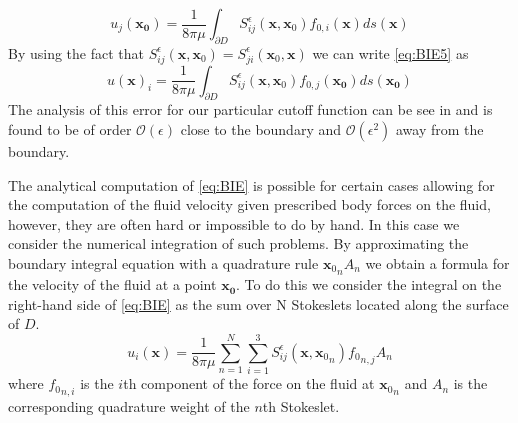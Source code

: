 \begin{equation}
    u_j(\mathbf{x_0}) = \frac{1}{8 \pi \mu} \int_{\partial D} S_{i j}^{\epsilon}\left(\mathbf{x}, \mathbf{x}_{0}\right) f_{0,i}(\mathbf{x}) d s(\mathbf{x})
\end{equation}
By using the fact that $S_{i j}^{\epsilon}\left(\mathbf{x}, \mathbf{x}_{0}\right) = S_{j i}^{\epsilon}\left(\mathbf{x}_{0}, \mathbf{x}\right)$ we can write \cref{eq:BIE5} as 
\begin{equation}
  \label{eq:BIE}
    u(\mathbf{x})_i=\frac{1}{8 \pi \mu} \int_{\partial D} S_{i j}^{\epsilon}\left(\mathbf{x}, \mathbf{x}_{0}\right) f_{0,j}(\mathbf{x_0}) d s(\mathbf{x_0})
\end{equation}
The analysis of this error for our particular cutoff function can be see in \cite{Cortez2005} and is found to be of order $\mathcal{O}(\epsilon)$ close to the boundary and $\mathcal{O}(\epsilon^2)$ away from the boundary.


The analytical computation of \cref{eq:BIE} is possible for certain cases allowing for the computation of the fluid velocity given prescribed body forces on the fluid, however, they are often hard or impossible to do by hand. In this case we consider the numerical integration of such problems. By approximating the boundary integral equation with a quadrature rule ${\mathbf{x}_0}_n A_n$ we obtain a formula for the velocity of the fluid at a point $\mathbf{x_0}$. To do this we consider the integral on the right-hand side of \cref{eq:BIE} as the sum over N Stokeslets located along the surface of $D$. 
\begin{equation}
\label{eq:Stokesletsum}
    u_{i}\left(\mathbf{x}\right)=\frac{1}{8 \pi \mu} \sum_{n=1}^{N} \sum_{i=1}^{3} S_{i j}^{\epsilon}\left(\mathbf{x}, {\mathbf{x}_0}_{n}\right) {f_0}_{n, j} A_{n}
\end{equation}
where ${f_0}_{n, i}$ is the $i$th component of the force on the fluid at ${\mathbf{x}_0}_n$ and $A_n$ is the corresponding quadrature weight of the $n$th Stokeslet. 

